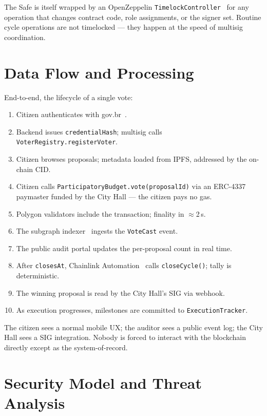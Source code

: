 \documentclass[12pt]{article}
\begin{document}
The Safe is itself wrapped by an OpenZeppelin
\texttt{TimelockController}~\cite{openzeppelin5} for any operation that
changes contract code, role assignments, or the signer set. Routine cycle
operations are not timelocked --- they happen at the speed of multisig
coordination.

\section{Data Flow and Processing}
\label{sec:dataflow}

End-to-end, the lifecycle of a single vote:

\begin{enumerate}
  \item Citizen authenticates with gov.br~\cite{govbrmanual}.
  \item Backend issues \texttt{credentialHash}; multisig calls
        \texttt{VoterRegistry.registerVoter}.
  \item Citizen browses proposals; metadata loaded from IPFS, addressed by
        the on-chain CID.
  \item Citizen calls \texttt{ParticipatoryBudget.vote(proposalId)} via an
        ERC-4337~\cite{eip4337} paymaster funded by the City Hall --- the
        citizen pays no gas.
  \item Polygon validators include the transaction; finality in \(\approx\)2\,s.
  \item The subgraph indexer~\cite{thegraphdocs} ingests the
        \texttt{VoteCast} event.
  \item The public audit portal updates the per-proposal count in real time.
  \item After \texttt{closesAt}, Chainlink
        Automation~\cite{chainlinkautomation} calls \texttt{closeCycle()};
        tally is deterministic.
  \item The winning proposal is read by the City Hall's SIG via webhook.
  \item As execution progresses, milestones are committed to
        \texttt{ExecutionTracker}.
\end{enumerate}

The citizen sees a normal mobile UX; the auditor sees a public event log;
the City Hall sees a SIG integration. Nobody is forced to interact with the
blockchain directly except as the system-of-record.

\section{Security Model and Threat Analysis}
\label{sec:security}
\end{document}
